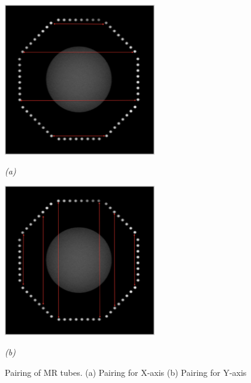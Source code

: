 \begin{figure}[htb]
  \begin{center}
    \begin{minipage}[b]{2.6in}
      \centering
      \centerline{\mbox{\includegraphics[width=2.6in]{parameters/images/tubes_pairing_x.eps}}}
      \centerline{\emph{(a)}}
    \end{minipage}
    \begin{minipage}[b]{2.6in}
      \centering
      \centerline{\mbox{\includegraphics[width=2.6in]{parameters/images/tubes_pairing_y.eps}}}
      \centerline{\emph{(b)}}
    \end{minipage}
  \end{center}
  \caption{Pairing of MR tubes. (a) Pairing for X-axis (b) Pairing for Y-axis}
  \label{fig:correction_tube_pairing_xy}
\end{figure}

